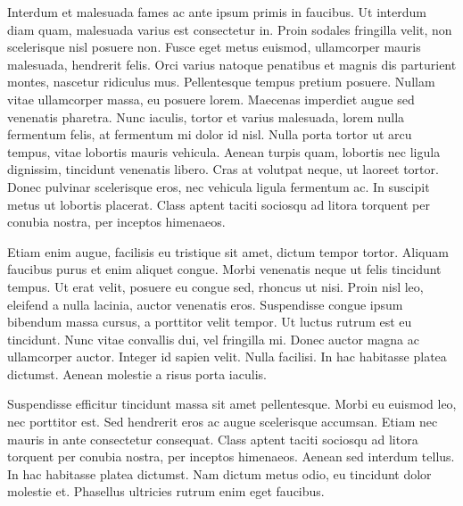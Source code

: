 \documentclass{article}
\begin{document}
Interdum et malesuada fames ac ante ipsum primis in faucibus. Ut interdum diam quam, malesuada varius est consectetur in. Proin sodales fringilla velit, non scelerisque nisl posuere non. Fusce eget metus euismod, ullamcorper mauris malesuada, hendrerit felis. Orci varius natoque penatibus et magnis dis parturient montes, nascetur ridiculus mus. Pellentesque tempus pretium posuere. Nullam vitae ullamcorper massa, eu posuere lorem. Maecenas imperdiet augue sed venenatis pharetra. Nunc iaculis, tortor et varius malesuada, lorem nulla fermentum felis, at fermentum mi dolor id nisl. Nulla porta tortor ut arcu tempus, vitae lobortis mauris vehicula. Aenean turpis quam, lobortis nec ligula dignissim, tincidunt venenatis libero. Cras at volutpat neque, ut laoreet tortor. Donec pulvinar scelerisque eros, nec vehicula ligula fermentum ac. In suscipit metus ut lobortis placerat. Class aptent taciti sociosqu ad litora torquent per conubia nostra, per inceptos himenaeos.


Etiam enim augue, facilisis eu tristique sit amet, dictum tempor tortor. Aliquam faucibus purus et enim aliquet congue. Morbi venenatis neque ut felis tincidunt tempus. Ut erat velit, posuere eu congue sed, rhoncus ut nisi. Proin nisl leo, eleifend a nulla lacinia, auctor venenatis eros. Suspendisse congue ipsum bibendum massa cursus, a porttitor velit tempor. Ut luctus rutrum est eu tincidunt. Nunc vitae convallis dui, vel fringilla mi. Donec auctor magna ac ullamcorper auctor. Integer id sapien velit. Nulla facilisi. In hac habitasse platea dictumst. Aenean molestie a risus porta iaculis.


Suspendisse efficitur tincidunt massa sit amet pellentesque. Morbi eu euismod leo, nec porttitor est. Sed hendrerit eros ac augue scelerisque accumsan. Etiam nec mauris in ante consectetur consequat. Class aptent taciti sociosqu ad litora torquent per conubia nostra, per inceptos himenaeos. Aenean sed interdum tellus. In hac habitasse platea dictumst. Nam dictum metus odio, eu tincidunt dolor molestie et. Phasellus ultricies rutrum enim eget faucibus.
\end{document}
